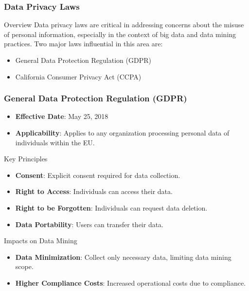 \documentclass[aspectratio=169]{beamer}
\begin{document}
\begin{frame}[fragile]
    \frametitle{Data Privacy Laws}
    \begin{block}{Overview}
        Data privacy laws are critical in addressing concerns about the misuse of personal information, especially in the context of big data and data mining practices. Two major laws influential in this area are:
        \begin{itemize}
            \item General Data Protection Regulation (GDPR)
            \item California Consumer Privacy Act (CCPA)
        \end{itemize}
    \end{block}
\end{frame}

\begin{frame}[fragile]
    \frametitle{General Data Protection Regulation (GDPR)}
    \begin{itemize}
        \item \textbf{Effective Date}: May 25, 2018
        \item \textbf{Applicability}: Applies to any organization processing personal data of individuals within the EU.
    \end{itemize}
    \begin{block}{Key Principles}
        \begin{itemize}
            \item \textbf{Consent}: Explicit consent required for data collection.
            \item \textbf{Right to Access}: Individuals can access their data.
            \item \textbf{Right to be Forgotten}: Individuals can request data deletion.
            \item \textbf{Data Portability}: Users can transfer their data.
        \end{itemize}
    \end{block}
    \begin{block}{Impacts on Data Mining}
        \begin{itemize}
            \item \textbf{Data Minimization}: Collect only necessary data, limiting data mining scope.
            \item \textbf{Higher Compliance Costs}: Increased operational costs due to compliance.
        \end{itemize}
    \end{block}
\end{frame}
\end{document}
